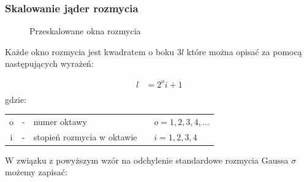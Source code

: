 \subsubsection{Skalowanie jąder rozmycia}
\begin{figure}[!htb]
\centering
{}
\caption{Przeskalowane okna rozmycia}
\label{fig:surf_bay_prescale_gaussian}
\end{figure}
Każde okno rozmycia jest kwadratem o boku $3l$ które można opisać za pomocą następujących wyrażeń:

\begin{align}
 l &= 2^oi+1\\
\label{eqn:liczym_l}
\end{align}
gdzie:

{\centering
\begin{tabular}{cclll}
o & - &  numer oktawy     &&$o=1,2,3,4,...$\\ 
i & - & stopień rozmycia w oktawie &&$i=1,2,3,4$\\ 
\end{tabular} 
}
W związku z powyższym wzór na odchylenie standardowe rozmycia Gaussa $\sigma$ możemy zapisać:

